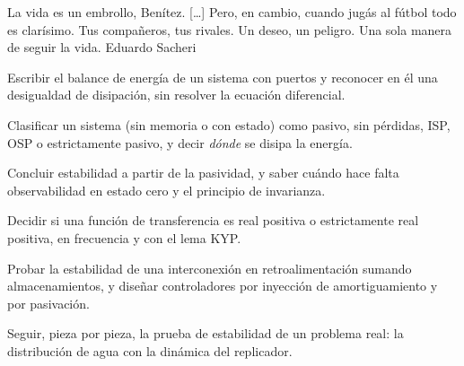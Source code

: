 
  {La vida es un embrollo, Benítez. [\dots] Pero, en cambio, cuando jugás al fútbol todo es clarísimo. Tus compañeros, tus rivales. Un deseo, un peligro. Una sola manera de seguir la vida.}
  {Eduardo Sacheri}

\begin{objetivos}
  \item Escribir el balance de energía de un sistema con puertos y reconocer en él una desigualdad de disipación, sin resolver la ecuación diferencial.
  \item Clasificar un sistema (sin memoria o con estado) como pasivo, sin pérdidas, ISP, OSP o estrictamente pasivo, y decir \emph{dónde} se disipa la energía.
  \item Concluir estabilidad a partir de la pasividad, y saber cuándo hace falta observabilidad en estado cero y el principio de invarianza.
  \item Decidir si una función de transferencia es real positiva o estrictamente real positiva, en frecuencia y con el lema KYP.
  \item Probar la estabilidad de una interconexión en retroalimentación sumando almacenamientos, y diseñar controladores por inyección de amortiguamiento y por pasivación.
  \item Seguir, pieza por pieza, la prueba de estabilidad de un problema real: la distribución de agua con la dinámica del replicador.
\end{objetivos}












